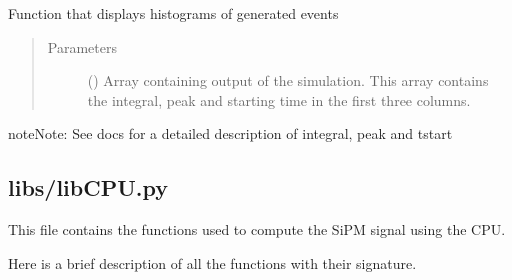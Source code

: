 \documentclass[letterpaper,10pt,english]{sphinxmanual}
\begin{document}

\begin{fulllineitems}
\label{\detokenize{structure:libs.lib.somestats}}
Function that displays histograms of generated events
\begin{quote}\begin{description}
\item[{Parameters}] \leavevmode
{} () \textendash{} Array containing output of the simulation.
This array contains the integral,
peak and starting time in the first three columns.

\end{description}\end{quote}

\begin{sphinxadmonition}{note}{Note:}
See docs for a detailed description of integral, peak and tstart
\end{sphinxadmonition}

\end{fulllineitems}



\subsection{libs/libCPU.py}
\label{\detokenize{structure:libs-libcpu-py}}
\begin{DUlineblock}{0em}
\item[] This file contains the functions used to compute the SiPM signal using the CPU.
\item[] Here is a brief description of all the functions with their signature.
\end{DUlineblock}
\end{document}
